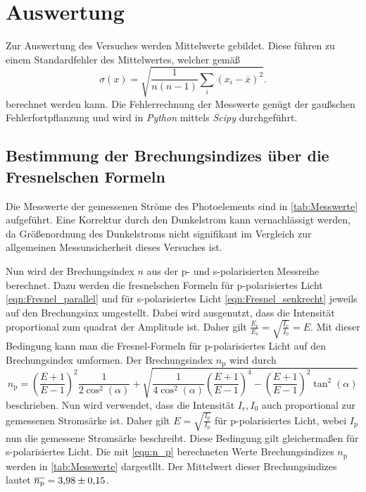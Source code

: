 \section{Auswertung}
\label{sec:Auswertung}
Zur Auswertung des Versuches werden Mittelwerte gebildet. Diese führen zu einem Standardfehler des Mittelwertes, welcher gemäß
\begin{equation*}
  \label{eqn:MW-Fehler}
  \sigma(x) = \sqrt{\frac{1}{n(n-1)} \sum_i (x_i - \overline{x})^2}.
\end{equation*}
berechnet werden kann. Die Fehlerrechnung der Messwerte genügt der gaußschen Fehlerfortpflanzung und wird in \textit{Python} mittels \textit{Scipy} \cite{scipy} durchgeführt.

\subsection{Bestimmung der Brechungsindizes über die Fresnelschen Formeln}
\label{subsec:Index_Fresnel}
Die Messwerte der gemessenen Ströme des Photoelements sind in \autoref{tab:Messwerte} aufgeführt. Eine Korrektur durch den Dunkelstrom kann vernachlässigt werden, da 
Größenordnung des Dunkelstroms nicht signifikant im Vergleich zur allgemeinen Messunsicherheit dieses Versuches ist. 

Nun wird der Brechungsindex $n$ aus der p- und s-polarisierten Messreihe berechnet. 
Dazu werden die fresnelschen Formeln für p-polarisiertes Licht \eqref{eqn:Fresnel_parallel} und für s-polarisiertes Licht \eqref{eqn:Fresnel_senkrecht} jeweils auf den 
Brechungsinx umgestellt. Dabei wird ausgenutzt, dass die Intensität proportional zum quadrat der Amplitude ist. 
Daher gilt $\frac{E_\text{r}}{E_\text{e}} = \sqrt{\frac{I_r}{I_0}} = E$. Mit dieser Bedingung kann man die Fresnel-Formeln für p-polarisiertes Licht 
auf den Brechungsindex umformen. Der Brechungsindex $n_\text{p}$ wird durch 
\begin{equation}
  \label{eqn:n_p}
  n_\text{p} = \left(\frac{E + 1}{E - 1}\right)^2 \frac{1}{2\cos^2(\alpha)} + \sqrt{\frac{1}{4\cos^2(\alpha)}\left(\frac{E + 1}{E - 1}\right)^4 - \left(\frac{E + 1}{E - 1}\right)^2\tan^2(\alpha)}
\end{equation}
beschrieben. Nun wird verwendet, dass die Intensität $I_r, I_0$ auch proportional zur gemessenen Stromsärke ist. Daher gilt $E = \sqrt{\frac{I_p}{I_0}}$ für p-polarisiertes
Licht, webei $I_p$ nun die gemessene Stromsärke beschreibt. Diese Bedingung gilt gleichermaßen für s-polarisiertes Licht. Die mit \autoref{eqn:n_p} berechneten Werte Brechungsindizes $n_\text{p}$
werden in \autoref{tab:Messwerte} dargestllt. Der Mittelwert dieser Brechungsindizes lautet $\overline{n_\text{p}} = \num{3.98+-0.15}$.

